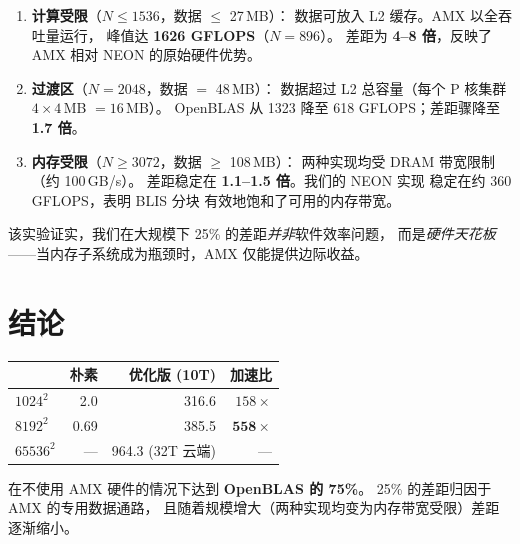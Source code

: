 \documentclass[11pt,a4paper]{article}
\begin{document}
\begin{enumerate}[nosep]
  \item \textbf{计算受限}（$N \le 1536$，数据 $\le$ 27\,MB）：
    数据可放入 L2 缓存。AMX 以全吞吐量运行，
    峰值达 \textbf{1626 GFLOPS}（$N{=}896$）。
    差距为 \textbf{4--8 倍}，反映了 AMX 相对 NEON 的原始硬件优势。
  \item \textbf{过渡区}（$N{=}2048$，数据 $=$ 48\,MB）：
    数据超过 L2 总容量（每个 P 核集群 $4 \times 4$\,MB $= 16$\,MB）。
    OpenBLAS 从 1323 降至 618 GFLOPS；差距骤降至 \textbf{1.7 倍}。
  \item \textbf{内存受限}（$N \ge 3072$，数据 $\ge$ 108\,MB）：
    两种实现均受 DRAM 带宽限制（约 100\,GB/s）。
    差距稳定在 \textbf{1.1--1.5 倍}。我们的 NEON 实现
    稳定在约 360 GFLOPS，表明 BLIS 分块
    有效地饱和了可用的内存带宽。
\end{enumerate}

该实验证实，我们在大规模下 25\% 的差距\emph{并非}软件效率问题，
而是\emph{硬件天花板}——当内存子系统成为瓶颈时，AMX 仅能提供边际收益。


\section{结论}

\begin{table}[H]\centering
\begin{tabular}{l|rrr}
\toprule & 朴素 & 优化版 (10T) & 加速比 \\
\midrule $1024^2$ & 2.0 & 316.6 & $158\times$ \\
$8192^2$ & 0.69 & 385.5 & $\mathbf{558\times}$ \\
$65536^2$ & --- & 964.3 (32T 云端) & --- \\
\bottomrule
\end{tabular}
\end{table}

在不使用 AMX 硬件的情况下达到 \textbf{OpenBLAS 的 75\%}。
25\% 的差距归因于 AMX 的专用数据通路，
且随着规模增大（两种实现均变为内存带宽受限）差距逐渐缩小。


\end{document}

